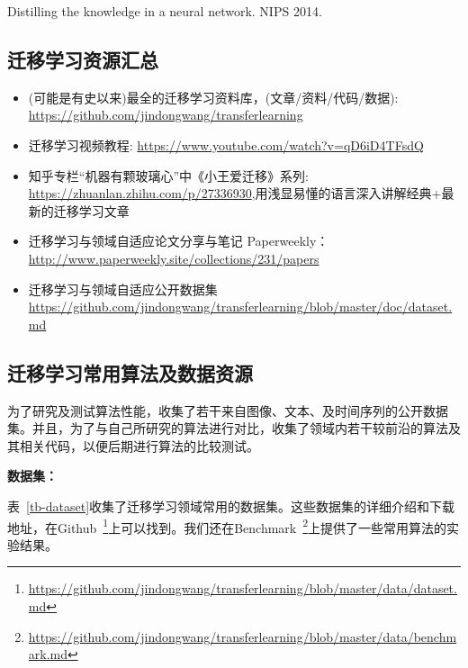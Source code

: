 Distilling the knowledge in a neural network. NIPS 2014.

\subsection{迁移学习资源汇总}

\begin{itemize}
	\item (可能是有史以来)最全的迁移学习资料库，(文章/资料/代码/数据):	\url{https://github.com/jindongwang/transferlearning}
	\item 迁移学习视频教程:	\url{https://www.youtube.com/watch?v=qD6iD4TFsdQ}
	\item 知乎专栏“机器有颗玻璃心”中《小王爱迁移》系列:	\url{https://zhuanlan.zhihu.com/p/27336930},用浅显易懂的语言深入讲解经典+最新的迁移学习文章
	\item 迁移学习与领域自适应论文分享与笔记	Paperweekly：\url{http://www.paperweekly.site/collections/231/papers}
	\item 迁移学习与领域自适应公开数据集
	\url{https://github.com/jindongwang/transferlearning/blob/master/doc/dataset.md}
\end{itemize}

\subsection{迁移学习常用算法及数据资源}
\label{sec-dataset}

为了研究及测试算法性能，收集了若干来自图像、文本、及时间序列的公开数据集。并且，为了与自己所研究的算法进行对比，收集了领域内若干较前沿的算法及其相关代码，以便后期进行算法的比较测试。

\textbf{数据集：}

表~\ref{tb-dataset}收集了迁移学习领域常用的数据集。这些数据集的详细介绍和下载地址，在Github~\footnote{\url{https://github.com/jindongwang/transferlearning/blob/master/data/dataset.md}}上可以找到。我们还在Benchmark~\footnote{\url{https://github.com/jindongwang/transferlearning/blob/master/data/benchmark.md}}上提供了一些常用算法的实验结果。

